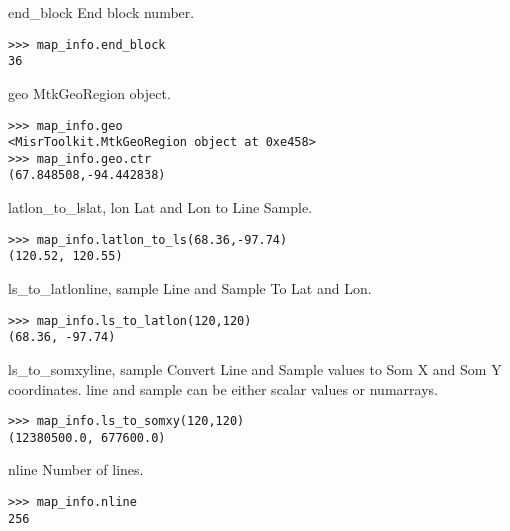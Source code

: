 \documentclass{howto}
\begin{document}
\begin{memberdesc}[int]{end_block}
  End block number.

\begin{verbatim}
>>> map_info.end_block
36
\end{verbatim}
\end{memberdesc}

\begin{memberdesc}[MtkGeoRegion]{geo}
  MtkGeoRegion object.

\begin{verbatim}
>>> map_info.geo
<MisrToolkit.MtkGeoRegion object at 0xe458>
>>> map_info.geo.ctr
(67.848508,-94.442838)
\end{verbatim}
\end{memberdesc}

\begin{methoddesc}{latlon_to_ls}{lat, lon}
    Lat and Lon to Line Sample.

\begin{verbatim}
>>> map_info.latlon_to_ls(68.36,-97.74)             
(120.52, 120.55)
\end{verbatim}
\end{methoddesc}

\begin{methoddesc}{ls_to_latlon}{line, sample}
    Line and Sample To Lat and Lon.

\begin{verbatim}
>>> map_info.ls_to_latlon(120,120)
(68.36, -97.74)
\end{verbatim}
\end{methoddesc}

\begin{methoddesc}{ls_to_somxy}{line, sample}
    Convert Line and Sample values to Som X and Som Y coordinates.  line and sample can be either scalar values or numarrays.

\begin{verbatim}
>>> map_info.ls_to_somxy(120,120) 
(12380500.0, 677600.0)
\end{verbatim}
\end{methoddesc}

\begin{memberdesc}[int]{nline}
  Number of lines.

\begin{verbatim}
>>> map_info.nline                            
256
\end{verbatim}
\end{memberdesc}
\end{document}
